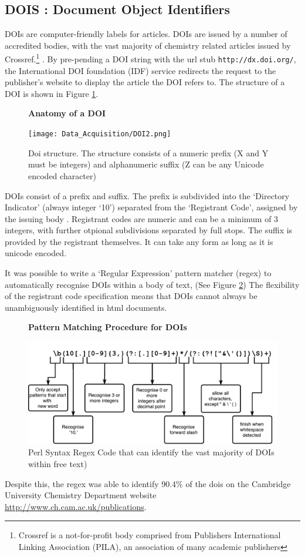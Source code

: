 \subsection{DOIS : Document Object Identifiers}
\label{sec:DOI}
DOIs are computer-friendly labels for articles. DOIs are issued by a number of accredited bodies, with the vast majority of chemistry related articles issued by Crossref.\footnote{Crossref is a not-for-profit body comprised from Publishers International Linking Association (PILA), an association of many academic publishers} \cite{crossref-formation}. By pre-pending a DOI string with the url stub \texttt{http://dx.doi.org/}, the International DOI foundation (IDF) service redirects the request to the publisher's website to display the article the DOI refers to. The structure of a DOI is shown in Figure \ref{fig:DOI}.
\begin{figure}[H]
    \centering
    \textbf{Anatomy of a DOI}\par\medskip
    \texttt{[image: Data\_Acquisition/DOI2.png]}
    \caption[Anatomy of a DOI]{Doi structure. The structure consists of a numeric prefix (X and Y must be integers) and alphanumeric suffix (Z can be any Unicode encoded character) \label{fig:DOI}}
\end{figure}
DOIs consist of a prefix and suffix. The prefix is subdivided into the ‘Directory Indicator’ (always integer ‘10’) separated from the ‘Registrant Code’, assigned by the issuing body \cite{doi_handbook1}. Registrant codes are numeric and can be a minimum of 3 integers, with further otpional subdivisions separated by full stops. The suffix is provided by the registrant themselves. It can take any form as long as it is unicode encoded\cite{doi_handbook1}.


It was possible to write a `Regular Expression' pattern matcher (regex) to automatically recognise DOIs within a body of text, (See Figure \ref{fig:REGEX}) The flexibility of the registrant code specification means that DOIs cannot always be unambiguously identified in html documents. 
\begin{figure}[H]
    \centering
    \textbf{Pattern Matching Procedure for DOIs}\par\medskip
    \includegraphics[width=\textwidth]{Data_Acquisition/Regex.pdf}
    \caption[Pattern Matching Procdure for DOIs]{Perl Syntax Regex Code that can identify the vast majority of DOIs within free text) \label{fig:REGEX}}
\end{figure}
Despite this, the regex was able to identify 90.4\% of the dois on the Cambridge University Chemistry Department website \url{http://www.ch.cam.ac.uk/publications}. 
